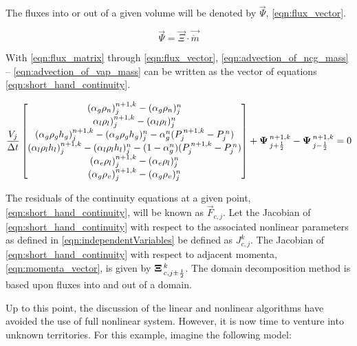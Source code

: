 The fluxes into or out of a given volume will be denoted by $\vec{\Psi}$, \eqref{eqn:flux_vector}.

\begin{equation}
\label{eqn:flux_vector}
\vec{\Psi} = \vec{\Xi} \cdot \vec{\dot{m}}
\end{equation}

With \eqref{eqn:flux_matrix} through \eqref{eqn:flux_vector}, \eqref{eqn:advection_of_ncg_mass} -- \eqref{eqn:advection_of_vap_mass} can be written as the vector of equations \eqref{eqn:short_hand_continuity}.

\begin{equation}
\label{eqn:short_hand_continuity}
\frac{V_j}{\dt} \begin{bmatrix}
(\alpha_{g} \rho_{n})^{n+1, k}_{j} - (\alpha_{g} \rho_{n})^{n}_{j} \\
\alpha_{l} \rho_{l})^{n+1, k}_{j} - (\alpha_{l} \rho_{l})^{n}_{j} \\
(\alpha_{g} \rho_{g} h_{g})^{n+1, k}_{j} - (\alpha_{g} \rho_g h_{g})^{n}_{j} - \alpha^{n}_{g} ( P^{\, n+1, k}_{j} - P^{\,n}_{j} )  \\
(\alpha_{l} \rho_{l} h_{l})^{n+1, k}_{j} - (\alpha_{l} \rho_{l} h_{l} )^{n}_{j} - (1 - \alpha^{n}_{g}) ( P^{\, n+1, k}_{j} - P^{\,n}_{j} )\\
(\alpha_{e} \rho_{l})^{n+1, k}_{j} - (\alpha_{e} \rho_{l})^{n}_{j} \\
(\alpha_{g} \rho_{v})^{n+1, k}_{j} - (\alpha_{g} \rho_{v})^{n}_{j} 
\end{bmatrix} + \vec{\Psi}^{n+1, k}_{j + \onehalf} - \vec{\Psi}^{n+1, k}_{j - \onehalf}= 0
\end{equation}

The residuals of the continuity equations at a given point, \eqref{eqn:short_hand_continuity}, will be known as $\vec{F}_{c, j}$.
Let the Jacobian of \eqref{eqn:short_hand_continuity} with respect to the associated nonlinear parameters as defined in \eqref{eqn:independentVariables} be defined as $J^{k}_{c, j}$.
The Jacobian of \eqref{eqn:short_hand_continuity} with respect to adjacent momenta, \eqref{eqn:momenta_vector}, is given by $\vec{\Xi}^{k}_{c, j \pm \onehalf}$.
The domain decomposition method is based upon fluxes into and out of a domain.

Up to this point, the discussion of the linear and nonlinear algorithms have avoided the use of full nonlinear system.
However, it is now time to venture into unknown territories.
For this example, imagine the following model:

